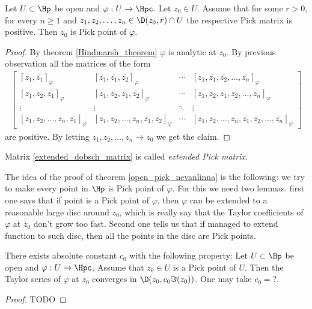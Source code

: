 \begin{lem}
	Let $U \subset \Hp$ be open and $\varphi : U \to \Hpc$. Let $z_{0} \in U$. Assume that for some $r > 0$, for every $n \geq 1$ and $z_{1}, z_{2}, \ldots, z_{n} \in \D(z_{0}, r) \cap U$ the respective Pick matrix is positive. Then $z_{0}$ is Pick point of $\varphi$.
\end{lem}
\begin{proof}
	By theorem \ref{Hindmarsh_theorem} $\varphi$ is analytic at $z_{0}$. By previous observation all the matrices of the form
\begin{align}\label{extended_dobsch_matrix}
\begin{bmatrix}
	[z_{1}, \overline{z_{1}}]_{\varphi} & [z_{1}, \overline{z_{1}}, \overline{z_{2}}]_{\varphi} & \cdots & [z_{1}, \overline{z_{1}}, \overline{z_{2}}, \ldots, \overline{z_{n}}]_{\varphi} \\
	[z_{1}, z_{2}, \overline{z_{1}}]_{\varphi} & [z_{1}, z_{2}, \overline{z_{1}}, \overline{z_{2}}]_{\varphi} & \cdots & [z_{1}, z_{2}, \overline{z_{1}}, \overline{z_{2}}, \ldots, \overline{z_{n}}]_{\varphi} \\
	\vdots & \vdots & \ddots & \vdots \\
	[z_{1}, z_{2}, \ldots, z_{n}, \overline{z_{1}}]_{\varphi} & [z_{1}, z_{2}, \ldots, z_{n}, \overline{z_{1}}, \overline{z_{2}}]_{\varphi} & \cdots &  [z_{1}, z_{2}, \ldots, z_{n}, \overline{z_{1}}, \overline{z_{2}}, \ldots, \overline{z_{n}}]_{\varphi}
\end{bmatrix}
\end{align}
are positive. By letting $z_{1}, z_{2}, \ldots, z_{n} \to z_{0}$ we get the claim.
\end{proof}
Matrix \ref{extended_dobsch_matrix} is called \textit{extended Pick matrix}.

The idea of the proof of theorem \ref{open_pick_nevanlinna} is the following: we try to make every point in $\Hp$ is Pick point of $\varphi$. For this we need two lemmas. first one says that if point is a Pick point of $\varphi$, then $\varphi$ can be extended to a reasonable large disc around $z_{0}$, which is really say that the Taylor coefficients of $\varphi$ at $z_{0}$ don't grow too fast. Second one tells us that if managed to extend function to such disc, then all the points in the disc are Pick points.

\begin{lem}
	There exists absolute constant $c_{0}$ with the following property: Let $U \subset \Hp$ be open and $\varphi : U \to \Hpc$. Assume that $z_{0} \in U$ is a Pick point of $U$. Then the Taylor series of $\varphi$ at $z_{0}$ converges in $\D(z_{0}, c_{0} \Im(z_{0}))$. One may take $c_{0} = ?$.
\end{lem}
\begin{proof}
	TODO
\end{proof}

